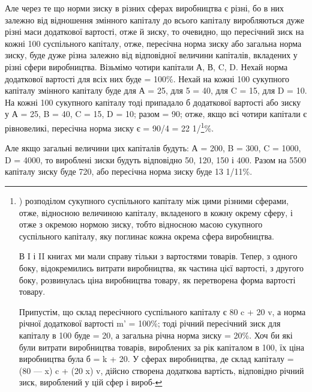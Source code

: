 Але через те що норми зиску в різних сферах виробництва
є різні, бо в них залежно від відношення змінного капіталу до
всього капіталу виробляються дуже різні маси додаткової вартості, отже й зиску, то очевидно, що
пересічний зиск на кожні
100 суспільного капіталу, отже, пересічна норма зиску або загальна норма зиску, буде дуже різна
залежно від відповідної
величини капіталів, вкладених у різні сфери виробництва. Візьмімо чотири капітали А, В, C, D. Нехай
норма додаткової вартості для всіх них буде = 100\%. Нехай на кожні 100 сукупного
капіталу змінного капіталу буде для А = 25, для 5 = 40, для
C = 15, для D = 10. На кожні 100 сукупного капіталу тоді припадало
б додаткової вартості або зиску у А = 25, B = 40, C = 15, D = 10; разом = 90; отже, якщо всі
чотири капітали є рівновеликі, пересічна норма зиску є = 90/4 = 22 1/\footnote{
) розподілом сукупного суспільного капіталу між цими різними сферами, отже, відносною величиною
капіталу, вкладеного
в кожну окрему сферу, і отже з окремою нормою зиску, тобто
відносною масою сукупного суспільного капіталу, яку поглинає
кожна окрема сфера виробництва.

В I і II книгах ми мали справу тільки з вартостями товарів.
Тепер, з одного боку, відокремились витрати виробництва, як
частина цієї вартості, з другого боку, розвинулась ціна виробництва товару, як перетворена форма
вартості товару.

Припустім, що склад пересічного суспільного капіталу є
80 c + 20 v, а норма річної додаткової вартості m' = 100\%; тоді
річний пересічний зиск для капіталу в 100 буде = 20, а загальна
річна норма зиску = 20\%. Хоч би які були витрати виробництва
товарів, вироблених за рік капіталом в 100, їх ціна виробництва була б = k + 20. У сферах
виробництва, де склад капіталу = (80 — x) c + (20 x) v, дійсно створена додаткова вартість,
відповідно річний зиск, вироблений у цій сфер і вироб-
}\%.

Але якщо загальні величини цих капіталів будуть: А = 200, B = 300, C = 1000, D = 4000, то вироблені
зиски будуть відповідно 50, 120, 150 і 400. Разом на 5500 капіталу зиску буде 720, або пересічна
норма зиску буде 13 1/11\%.

